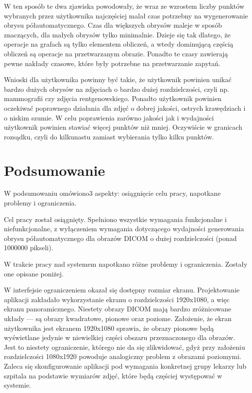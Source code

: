 \documentclass[a4paper,11pt,twoside,openright]{report}
\theoremstyle{definition}
\begin{document}
W ten sposób te dwa zjawiska powodowały, że wraz ze wzrostem liczby punktów wybranych przez użytkownika najczęściej malał czas potrzebny na wygenerowanie obrysu półautomatycznego. Czas dla większych obrysów maleje w sposób znaczących, dla małych obrysów tylko minimalnie. Dzieje się tak dlatego, że operacje na grafach są tylko elementem obliczeń, a wtedy dominującą częścią obliczeń są operacje na przetwarzanym obrazie. Ponadto te czasy zawierają pewne nakłady czasowe, które były potrzebne na przetwarzanie zapytań.

Wnioski dla użytkownika powinny być takie, że użytkownik powinien unikać bardzo dużych obrysów na zdjęciach o bardzo dużej rozdzielczości, czyli np. mammografii czy zdjęcia rentgenowskiego. Ponadto użytkownik powinien oczekiwać poprawnego działania dla zdjęć o dobrej jakości, ostrych krawędziach i o niskim szumie. W celu poprawienia zarówno jakości jak i wydajności użytkownik powinien stawiać więcej punktów niż mniej. Oczywiście w granicach rozsądku, czyli do kilkunastu zamiast wybierania tylko kilku punktów.

\chapter {Podsumowanie}

W podsumowaniu omówiono3 aspekty: osiągnięcie celu pracy, napotkane problemy i ograniczenia.

Cel pracy został osiągnięty. Spełniono wszystkie wymagania funkcjonalne i niefunkcjonalne, z wyłączeniem wymagania dotyczącego wydajności generowania obrysu półautomatycznego dla obrazów DICOM o dużej rozdzielczości (ponad 1000000 pikseli).

W trakcie pracy nad systemem napotkano różne problemy i ograniczenia. Zostały one opisane poniżej.

W interfejsie ograniczeniem okazał się dostępny rozmiar ekranu. Projektowanie aplikacji zakładało wykorzystanie ekranu o rozdzielczości 1920x1080, a więc ekranu panoramicznego. Niestety obrazy DICOM mają bardzo zróżnicowane układy --- są obrazy kwadratowe, pionowe oraz poziome. Założenie, że ekran użytkownika jest ekranem 1920x1080 sprawia, że obrazy pionowe będą wyświetlane jedynie w niewielkiej części obszaru przeznaczonego dla obrazów. Jest to niestety ograniczenie, którego nie da się zlikwidować, gdyż przy założeniu rozdzielczości 1080x1920 powoduje analogiczny problem z obrazami poziomymi. Zaleca się skonfigurowanie aplikacji pod wymagania konkretnej grupy lekarzy lub szpitala na podstawie wymiarów zdjęć, które będą częściej występować w systemie.
\end{document}
